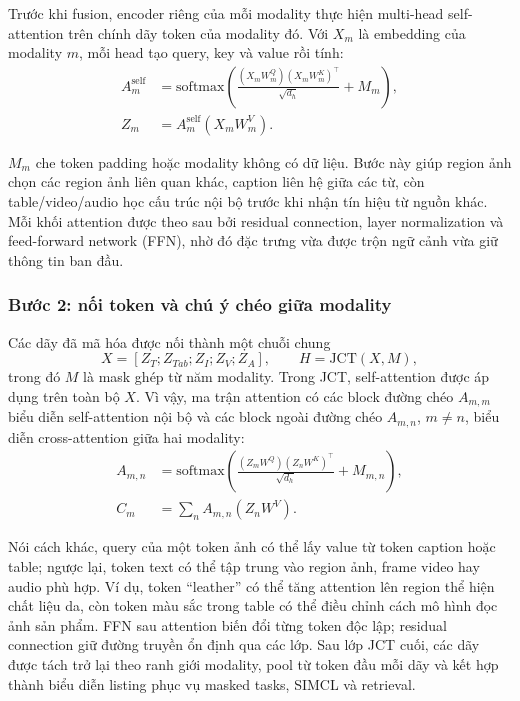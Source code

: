 \documentclass[10pt,conference]{IEEEtran}
\begin{document}
Trước khi fusion, encoder riêng của mỗi modality thực hiện multi-head self-attention trên chính dãy token của modality đó. Với $X_m$ là embedding của modality $m$, mỗi head tạo query, key và value rồi tính:
\begin{equation}
\begin{aligned}
A^{\mathrm{self}}_m &=
\mathrm{softmax}\left(
\frac{(X_mW^Q_m)(X_mW^K_m)^\top}{\sqrt{d_h}}+M_m
\right),\\
Z_m &= A^{\mathrm{self}}_m(X_mW^V_m).
\end{aligned}
\end{equation}

$M_m$ che token padding hoặc modality không có dữ liệu. Bước này giúp region ảnh chọn các region ảnh liên quan khác, caption liên hệ giữa các từ, còn table/video/audio học cấu trúc nội bộ trước khi nhận tín hiệu từ nguồn khác. Mỗi khối attention được theo sau bởi residual connection, layer normalization và feed-forward network (FFN), nhờ đó đặc trưng vừa được trộn ngữ cảnh vừa giữ thông tin ban đầu.

\subsubsection{Bước 2: nối token và chú ý chéo giữa modality}

Các dãy đã mã hóa được nối thành một chuỗi chung
\begin{equation}
X=[Z_T;Z_{Tab};Z_I;Z_V;Z_A],\qquad
H=\mathrm{JCT}(X,M),
\end{equation}
trong đó $M$ là mask ghép từ năm modality. Trong JCT, self-attention được áp dụng trên toàn bộ $X$. Vì vậy, ma trận attention có các block đường chéo $A_{m,m}$ biểu diễn self-attention nội bộ và các block ngoài đường chéo $A_{m,n}$, $m\ne n$, biểu diễn cross-attention giữa hai modality:
\begin{equation}
\begin{aligned}
A_{m,n} &=
\mathrm{softmax}\left(
\frac{(Z_mW^Q)(Z_nW^K)^\top}{\sqrt{d_h}}+M_{m,n}
\right),\\
C_m &= \sum_n A_{m,n}(Z_nW^V).
\end{aligned}
\end{equation}

Nói cách khác, query của một token ảnh có thể lấy value từ token caption hoặc table; ngược lại, token text có thể tập trung vào region ảnh, frame video hay audio phù hợp. Ví dụ, token ``leather'' có thể tăng attention lên region thể hiện chất liệu da, còn token màu sắc trong table có thể điều chỉnh cách mô hình đọc ảnh sản phẩm. FFN sau attention biến đổi từng token độc lập; residual connection giữ đường truyền ổn định qua các lớp. Sau lớp JCT cuối, các dãy được tách trở lại theo ranh giới modality, pool từ token đầu mỗi dãy và kết hợp thành biểu diễn listing phục vụ masked tasks, SIMCL và retrieval.
\end{document}
